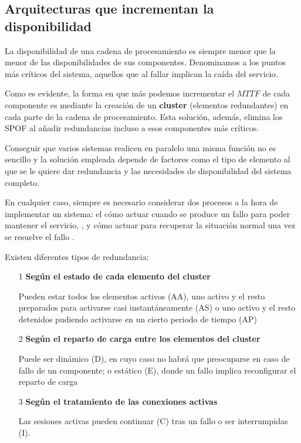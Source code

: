 \subsection{Arquitecturas que incrementan la disponibilidad}

La disponibilidad de una cadena de procesamiento es siempre menor que la menor de las disponibilidades de sus componentes. Denominamos  a los puntos más críticos del sistema, aquellos que al fallar implican la caída del servicio.

Como es evidente, la forma en que más podemos incrementar el $MTTF$ de cada componente es mediante la creación de un \textbf{cluster} (elementos redundantes) en cada parte de la cadena de procesamiento. Esta solución, además, elimina los SPOF al añadir redundancias incluso a esos componentes más críticos.

Conseguir que varios sistemas realicen en paralelo una misma función no es sencillo y la solución empleada depende de factores como el tipo de elemento al que se le quiere dar redundancia y las necesidades de disponibilidad del sistema completo.

En cualquier caso, siempre es necesario considerar dos procesos a la hora de implementar un sistema: el cómo actuar cuando se produce un fallo para poder mantener el servicio, , y cómo actuar para recuperar la situación normal una vez se resuelve el fallo .

Existen diferentes tipos de redundancia:
\begin{enumerate}
\item[1] \textbf{Según el estado de cada elemento del cluster}

Pueden estar todos los elementos activos (AA), uno activo y el resto preparados para activarse casi instantáneamente (AS) o uno activo y el resto detenidos pudiendo activarse en un cierto periodo de tiempo (AP)

\item[2] \textbf{Según el reparto de carga entre los elementos del cluster}

Puede ser dinámico (D), en cuyo caso no habrá que preocuparse en caso de fallo de un componente; o estático (E), donde un fallo implica reconfigurar el reparto de carga

\item[3] \textbf{Según el tratamiento de las conexiones activas}

Las sesiones activas pueden continuar (C) tras un fallo o ser interrumpidas (I).
\end{enumerate}

